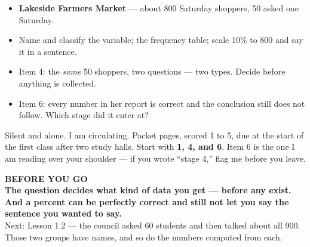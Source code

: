 \documentclass[aspectratio=169, 11pt]{beamer}
\begin{document}
\begin{frame}[t, plain]
  \begin{itemize}\setlength{\itemsep}{5pt}
    \item \textbf{Lakeside Farmers Market} --- about 800 Saturday shoppers, 50 asked one
          Saturday.
    \item Name and classify the variable; the frequency table; scale 10\% to 800 and say it
          in a sentence.
    \item Item 4: the \emph{same} 50 shoppers, two questions --- two types. Decide before
          anything is collected.
    \item Item 6: every number in her report is correct and the conclusion still does not
          follow. Which stage did it enter at?
  \end{itemize}
  \begin{block}{Silent and alone. I am circulating. Packet pages, scored 1 to 5, due at the start of the first class after two study halls.}
    Start with \textbf{1, 4, and 6}. Item 6 is the one I am reading over your shoulder --- if
    you wrote ``stage 4,'' flag me before you leave.
  \end{block}
\end{frame}

{
\begin{frame}[plain]
  \vspace{1.5cm}\hspace{0.8cm}%
  \begin{minipage}{0.86\textwidth}
    {\color{goldacc}\bfseries\small BEFORE YOU GO}\\[0.7cm]
    {\color{white}\bfseries\Large The question decides what kind of data you get --- before any
    exist. And a percent can be perfectly correct and still not let you say the sentence you
    wanted to say.}\\[0.9cm]
    {\color{frostmid}\small Next: Lesson 1.2 --- the council asked 60 students and then talked
    about all 900. Those two groups have names, and so do the numbers computed from each.}
  \end{minipage}
\end{frame}
}
\end{document}
